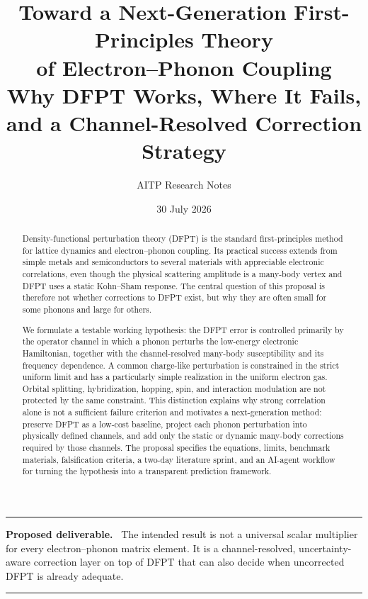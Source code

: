 \documentclass[11pt,a4paper]{article}
\title{\textbf{Toward a Next-Generation First-Principles Theory\\of Electron--Phonon Coupling}\\[0.45em]
\large Why DFPT Works, Where It Fails, and a Channel-Resolved Correction Strategy}
\author{AITP Research Notes}
\date{30 July 2026}
\newenvironment{keypoint}[1][Key point]
{\vspace{0.35em}\noindent\color{deepblue}\rule{\linewidth}{0.7pt}\par
 \noindent\textbf{#1.}\ \color{black}}
{\par\noindent\color{deepblue}\rule{\linewidth}{0.7pt}\color{black}\vspace{0.35em}}
\begin{document}
\maketitle

\begin{abstract}
Density-functional perturbation theory (DFPT) is the standard first-principles
method for lattice dynamics and electron--phonon coupling.  Its practical success
extends from simple metals and semiconductors to several materials with appreciable
electronic correlations, even though the physical scattering amplitude is a
many-body vertex and DFPT uses a static Kohn--Sham response.  The central question
of this proposal is therefore not whether corrections to DFPT exist, but why they
are often small for some phonons and large for others.

We formulate a testable working hypothesis: the DFPT error is controlled primarily
by the operator channel in which a phonon perturbs the low-energy electronic
Hamiltonian, together with the channel-resolved many-body susceptibility and its
frequency dependence.  A common charge-like perturbation is constrained in the
strict uniform limit and has a particularly simple realization in the uniform
electron gas.  Orbital splitting, hybridization, hopping, spin, and interaction
modulation are not protected by the same constraint.  This distinction explains
why strong correlation alone is not a sufficient failure criterion and motivates
a next-generation method: preserve DFPT as a low-cost baseline, project each
phonon perturbation into physically defined channels, and add only the static or
dynamic many-body corrections required by those channels.  The proposal specifies
the equations, limits, benchmark materials, falsification criteria, a two-day
literature sprint, and an AI-agent workflow for turning the hypothesis into a
transparent prediction framework.
\end{abstract}

\begin{keypoint}[Proposed deliverable]
The intended result is not a universal scalar multiplier for every
electron--phonon matrix element.  It is a channel-resolved, uncertainty-aware
correction layer on top of DFPT that can also decide when uncorrected DFPT is
already adequate.
\end{keypoint}

\tableofcontents
\listoffigures
\listoftables
\clearpage











\appendix







\end{document}
